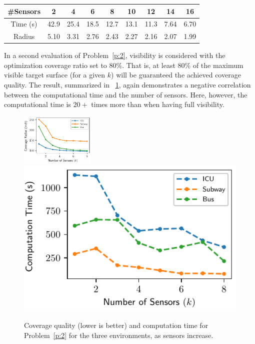 \vspace{1mm}
\begin{table}[!ht]
    \centering
    \begin{tabular}{|c|c|c|c|c|c|c|c|c|}
    \hline
        \#Sensors   & 2     &  4    & 6      & 8     & 10    & 12    & 14    & 16 \\
        \hline
        Time (s)    & 42.9   &  25.4    & 18.5  & 12.7 & 13.1  & 11.3  & 7.64 & 6.70 \\ 
        \hline
        Radius  & 5.10     &  3.31    & 2.76      & 2.43     & 2.27    & 2.16    & 2.07    & 1.99 \\
        \hline
    \end{tabular}
    \label{tab:Terrain}
\end{table}

In a second evaluation of Problem~\ref{p:2}, visibility is considered with the 
optimization coverage ratio set to $80\%$. That is, at least $80\%$ of the
maximum visible target surface (for a given $k$) will be guaranteed the achieved coverage 
quality. The result, summarized in ~\ref{fig:coverage-ratio-mq}, again 
demonstrates a negative correlation between the computational time and the number 
of sensors. Here, however, the computational time is $20+$ times  more 
than when having full visibility.

\begin{figure}[!ht]
    \centering
    \includegraphics[width=.46\columnwidth, height=0.98in]{chapters/surf/fig/result-radius-mq-eps-converted-to.pdf}
    \includegraphics[width=.49\columnwidth, height=1.in]{chapters/surf/fig/result-time-mq-eps-converted-to.pdf}
    \caption{Coverage quality (lower is better) and computation time for Problem~\ref{p:2}
    for the three environments, as sensors increase.}
    \label{fig:coverage-ratio-mq}
\end{figure}

